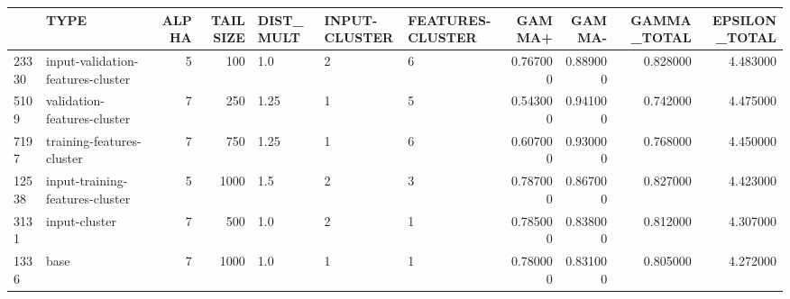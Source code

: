 \begin{tabular}{llrrlllrrrr}
\toprule
 & TYPE & ALPHA & TAILSIZE & DIST_MULT & INPUT-CLUSTER & FEATURES-CLUSTER & GAMMA+ & GAMMA- & GAMMA_TOTAL & EPSILON_TOTAL \\
\midrule
23330 & input-validation-features-cluster & 5 & 100 & 1.0 & 2 & 6 & 0.767000 & 0.889000 & 0.828000 & 4.483000 \\
5109 & validation-features-cluster & 7 & 250 & 1.25 & 1 & 5 & 0.543000 & 0.941000 & 0.742000 & 4.475000 \\
7197 & training-features-cluster & 7 & 750 & 1.25 & 1 & 6 & 0.607000 & 0.930000 & 0.768000 & 4.450000 \\
12538 & input-training-features-cluster & 5 & 1000 & 1.5 & 2 & 3 & 0.787000 & 0.867000 & 0.827000 & 4.423000 \\
3131 & input-cluster & 7 & 500 & 1.0 & 2 & 1 & 0.785000 & 0.838000 & 0.812000 & 4.307000 \\
1336 & base & 7 & 1000 & 1.0 & 1 & 1 & 0.780000 & 0.831000 & 0.805000 & 4.272000 \\
\bottomrule
\end{tabular}
